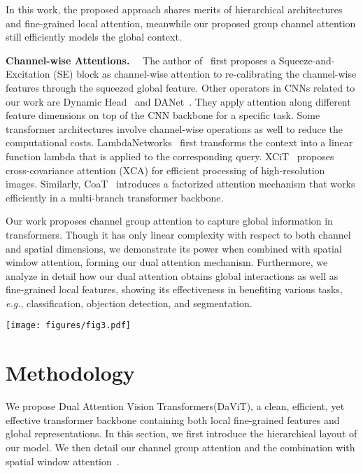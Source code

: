 \documentclass[runningheads]{llncs}
\newcommand{\eg}{\emph{e.g.}}
\newcommand{\model}{DaViT\xspace}
\newcommand{\modelFull}{Dual Attention Vision Transformers\xspace}
\begin{document}
In this work, the proposed approach shares merits of hierarchical architectures and fine-grained local attention, meanwhile our proposed group channel attention still efficiently models the global context. 


\noindent \textbf{Channel-wise Attentions.}~~
The author of~\cite{hu2018squeeze} first proposes a Squeeze-and-Excitation (SE) block as channel-wise attention to re-calibrating the channel-wise features through the squeezed global feature. Other operators in CNNs related to our work are Dynamic Head~\cite{dai2021dynamic} and DANet~\cite{fu2019dual}. They apply attention along different feature dimensions on top of the CNN backbone for a specific task. 
Some transformer architectures involve channel-wise operations as well to reduce the computational costs.
LambdaNetworks~\cite{bello2021lambdanetworks} first transforms the context into a linear function lambda that is applied to the corresponding query.
XCiT~\cite{ali2021xcit} proposes cross-covariance attention (XCA) for efficient processing of high-resolution images.
Similarly, CoaT~\cite{xu2021co} introduces a factorized attention mechanism that works efficiently in a multi-branch transformer backbone.

Our work proposes channel group attention to capture global information in transformers. Though it has only linear complexity with respect to both channel and spatial dimensions, we demonstrate its power when combined with spatial window attention, forming our dual attention mechanism.
Furthermore, we analyze in detail how our dual attention obtains global interactions as well as fine-grained local features, showing its effectiveness in benefiting various tasks, \eg, classification, objection detection, and segmentation.
 \begin{figure*}[t]
    \centering
    \texttt{[image: figures/fig3.pdf]}
    \vspace{-8pt}
    \caption{Model architecture for our dual attention block.
    It contains two transformer blocks: spatial window self-attention and channel group self-attention blocks.
    By alternately using the two types of attention, our model enjoys the benefit of capturing both local fine-grained and global image-level interactions.
    }
    \label{fig:architecture}
    \vspace{-8pt}
\end{figure*}

\section{Methodology}
We propose \modelFull (\model), a clean, efficient, yet effective transformer backbone containing both local fine-grained features and global representations.
In this section, we first introduce the hierarchical layout of our model. We then detail our channel group attention and the combination with spatial window attention~\cite{liu2021swin}.
\end{document}
